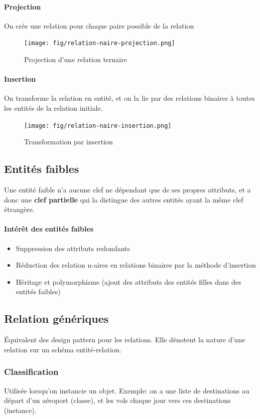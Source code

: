 \documentclass[a4paper]{article}
\begin{document}
\paragraph{Projection}
On crée une relation pour chaque paire possible de la relation
\begin{figure}[H]
    \center
    \texttt{[image: fig/relation-naire-projection.png]}
    \caption{\label{fig:relation-naire-projection}Projection d'une relation ternaire}
\end{figure}

\paragraph{Insertion}
On transforme la relation en entité, et on la lie par des relations binaires à
toutes les entités de la relation initiale.
\begin{figure}[H]
    \center
    \texttt{[image: fig/relation-naire-insertion.png]}
    \caption{Transformation par insertion}
\end{figure}

\subsection{Entités faibles}
Une entité faible n'a aucune clef ne dépendant que de ses propres attributs, et
a donc une \textbf{clef partielle} qui la distingue des autres entités ayant la
même clef étrangère.

\paragraph{Intérêt des entités faibles}
\begin{itemize}
  \item Suppression des attributs redondants
  \item Réduction des relation n-aires en relations binaires par la méthode d'insertion
  \item Héritage et polymorphisme (ajout des attributs des entités filles dans des entités faibles)
\end{itemize}

\subsection{Relation génériques}
\'Equivalent des design pattern pour les relations. Elle dénotent la nature d'une
relation sur un schéma entité-relation.

\subsubsection{Classification}
Utilisée lorsqu'on instancie un objet. Exemple: on a une liste de destinations
au départ d'un aéroport (classe), et les vols chaque jour vers ces destinations (instance).
\end{document}
